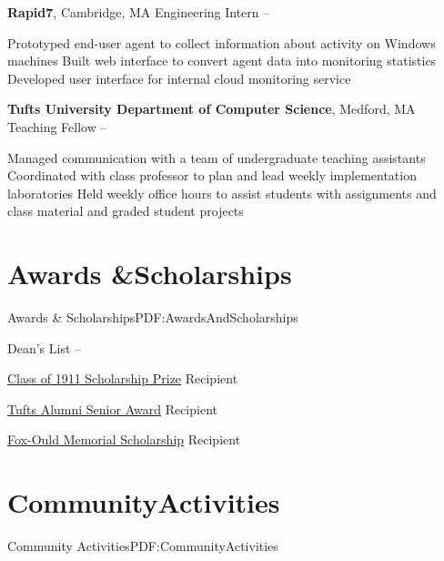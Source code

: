 \documentclass[letterpaper,MMMyyyy,nonstop]{simpleresumecv}
\begin{document}
\begin{body}
\BigGap

\textbf{Rapid7}, Cambridge, MA
\GapNoBreak
\BulletItem
Engineering Intern
\hfill
{} -- 
\begin{detail}
\SubBulletItem
Prototyped end-user agent to collect information about activity on Windows machines
\SubBulletItem
Built web interface to convert agent data into monitoring statistics
\SubBulletItem
Developed user interface for internal cloud monitoring service
\end{detail}

\BigGap

\textbf{Tufts University Department of Computer Science}, Medford, MA
\GapNoBreak
\BulletItem
Teaching Fellow
\hfill
{} -- 
\begin{detail}
\SubBulletItem
Managed communication with a team of undergraduate teaching assistants
\SubBulletItem
Coordinated with class professor to plan and lead weekly implementation laboratories
\SubBulletItem
Held weekly office hours to assist students with assignments and class material and graded student projects
\end{detail}


\section{Awards \&\newline Scholarships}{Awards \& Scholarships}{PDF:AwardsAndScholarships}

\BulletItem
Dean's List
\hfill
{} -- 

\BulletItem
\href{http://students.tufts.edu/academic-advice-and-support/academic-advising/what-we-offer/guidance-academic-policies/academic-awards}{Class of 1911 Scholarship Prize} Recipient
\hfill
{}

\BulletItem
\href{http://tuftsalumni.org/who-we-are/alumni-recognition/senior-awards/}{Tufts Alumni Senior Award} Recipient
\hfill
{}

\BulletItem
\href{http://www.rrpcusa.org/pages.asp?pageid=110003}{Fox-Ould Memorial Scholarship} Recipient
\hfill
{}


\section{Community\newline Activities}{Community Activities}{PDF:CommunityActivities}


\end{body}
\end{document}
